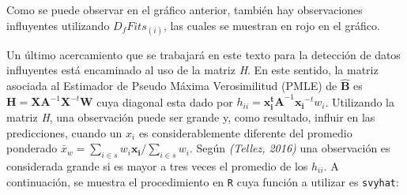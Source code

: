 \documentclass[
  spanish,
  12pt,
]{book}
\newenvironment{Shaded}{\begin{snugshade}}{\end{snugshade}}
\newcommand{\AttributeTok}[1]{\textcolor[rgb]{0.13,0.29,0.53}{#1}}
\newcommand{\DecValTok}[1]{\textcolor[rgb]{0.00,0.00,0.81}{#1}}
\newcommand{\FunctionTok}[1]{\textcolor[rgb]{0.13,0.29,0.53}{\textbf{#1}}}
\newcommand{\NormalTok}[1]{#1}
\newcommand{\OtherTok}[1]{\textcolor[rgb]{0.56,0.35,0.01}{#1}}
\newcommand{\SpecialCharTok}[1]{\textcolor[rgb]{0.81,0.36,0.00}{\textbf{#1}}}
\newcommand{\StringTok}[1]{\textcolor[rgb]{0.31,0.60,0.02}{#1}}
\begin{document}
\begin{Shaded}
\end{Shaded}

Como se puede observar en el gráfico anterior, también hay observaciones influyentes utilizando \(D_{f}Fits_{\left(i\right)}\), las cuales se muestran en rojo en el gráfico.

Un último acercamiento que se trabajará en este texto para la detección de datos influyentes está encaminado al uso de la matriz \emph{H}. En este sentido, la matriz asociada al Estimador de Pseudo Máxima Verosimilitud (PMLE) de \(\hat{\boldsymbol{B}}\) es \(\boldsymbol{H}=\boldsymbol{XA}^{-1}\boldsymbol{X}^{-t}\boldsymbol{W}\) cuya diagonal esta dado por \(h_{ii} = \boldsymbol{x_{i}^tA}^{-1}\boldsymbol{x_{i}}^{-t}w_{i}\). Utilizando la matriz \emph{H}, una observación puede ser grande y, como resultado, influir en las predicciones, cuando un \(x_i\) es considerablemente diferente del promedio ponderado \(\bar{x}_w=\sum_{i\in s}w_{i}\boldsymbol{x_{i}}\big/\sum_{i\in s}w_i\). Según \emph{(Tellez, 2016)} una observación es considerada grande si es mayor a tres veces el promedio de los \(h_{ii}\). A continuación, se muestra el procedimiento en \texttt{R} cuya función a utilizar es \texttt{svyhat}:
\end{document}
